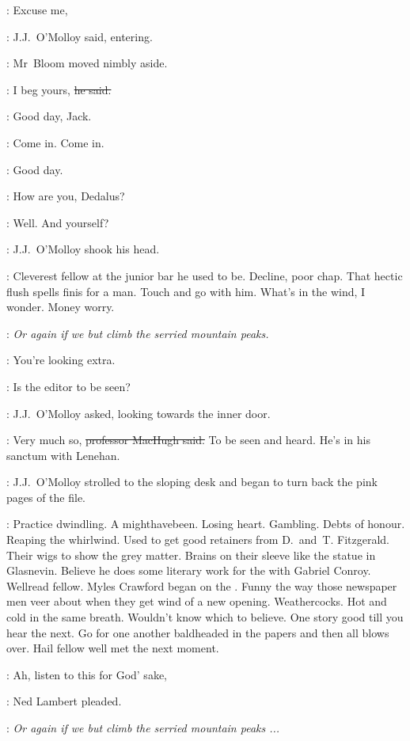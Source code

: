 \jjom:
Excuse me,

:
J.J.~O'Molloy said,
entering.

:
Mr~Bloom moved nimbly aside.

\Bloom:
I beg yours,
\sout{he said.}

\lambert:
Good day,
Jack.

\simon:
Come in.
Come in.

\machugh:
Good day.

\jjom:
How are you, Dedalus?

\simon:
Well. And yourself?

:
J.J.~O'Molloy shook his head.



\BloomInt:
Cleverest fellow at the junior bar he used to be.
Decline, poor chap.
That hectic flush spells finis for a man.
Touch and go with him.
What's in the wind, I wonder.
Money worry.

\lambert:
\emph{Or again if we but climb the serried mountain peaks.}

\simon:
You're looking extra.

\jjom:
Is the editor to be seen?

:
J.J.~O'Molloy asked,
looking towards the inner door.

\machugh:
Very much so,
\sout{professor MacHugh said.}
To be seen and heard.
He's in his sanctum
with Lenehan.

:
J.J.~O'Molloy strolled to the sloping desk
and began to turn back the pink pages of the file.

\BloomInt:
Practice dwindling.
A mighthavebeen.
Losing heart.
Gambling.
Debts of honour.
Reaping the whirlwind.
Used to get good retainers from D.~and~T. Fitzgerald.
Their wigs to show the grey matter.
Brains on their sleeve like the statue in Glasnevin.
Believe he does some literary work for the  with Gabriel Conroy.
Wellread fellow.
Myles Crawford began on the .
Funny the way those newspaper men veer about when they get wind of a new opening.
Weathercocks.
Hot and cold in the same breath.
Wouldn't know which to believe.
One story good till you hear the next.
Go for one another baldheaded in the papers and then all blows over.
Hail fellow well met the next moment.

\lambert:
Ah, listen to this for God' sake,

:
Ned Lambert pleaded.

\lambert:
\emph{Or again if we but climb the serried mountain peaks ...}

